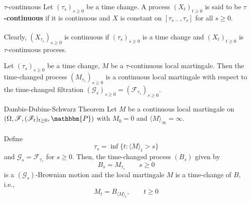 \documentclass[12pt,a4paper]{article}
\begin{document}
    \begin{definition}{$\tau$-continuous}{}
        Let $(\tau_s)_{s\ge 0}$ be a time change. A process $(X_t)_{t\ge 0}$ is said to be \textbf{$\tau$-continuous} if it is continuous and $X$ is constant on $[\tau_{s-},\tau_s]$ for all $s\ge 0$.\\
        \\
        Clearly, $(X_{\tau_s})_{s\ge 0}$ is continuous if $(\tau_s)_{s\ge 0}$ is a time change and $(X_t)_{t\ge 0}$ is $\tau$-continuous process.
    \end{definition}
    \begin{proposition}{}{}
        Let $(\tau_s)_{s\ge 0}$ be a time change, $M$ be a $\tau$-continuous local martingale. Then the time-changed process $(M_{\tau_s})_{s\ge 0}$ is a continuous local martingale with respect to the time-changed filtration $(\mathscr{G}_s)_{s\ge 0} = (\mathscr{F}_{\tau_s})_{s\ge 0}$.
    \end{proposition}
    \begin{theorem}{Dambis-Dubins-Schwarz Theorem}{}
    Let $M$ be a continuous local martingale on $(\Omega, \mathscr{F}, (\mathscr{F}_t)_{t\ge 0}, \mathbbm{P})$ with $M_0=0$ and $\langle M\rangle_\infty = \infty$.\\
    \\
    Define
    $$
    \tau_s = \inf\{t: \langle M\rangle_t>s\}
    $$
    and $\mathscr{G}_s = \mathscr{F}_{\tau_s}$ for $s\ge 0$. Then, the time-changed process $(B_s)$ given by 
    $$
    B_s = M_{\tau_s}\qquad s\ge 0
    $$
    is a $(\mathscr{G}_s)$-Brownian motion and the local martingale $M$ is a time-change of $B$, i.e.,
    $$
    M_t = B_{\langle M\rangle_t},\qquad t\ge 0
    $$
    \end{theorem}
\end{document}
